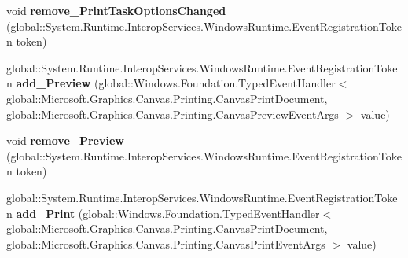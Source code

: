 \begin{DoxyCompactItemize}
\item 
\mbox{\label{interface_microsoft_1_1_graphics_1_1_canvas_1_1_printing_1_1_i_canvas_print_document_a1da96a2ebf4b67369628fa017a384b71}} 
void {\bfseries remove\+\_\+\+Print\+Task\+Options\+Changed} (global\+::\+System.\+Runtime.\+Interop\+Services.\+Windows\+Runtime.\+Event\+Registration\+Token token)
\item 
\mbox{\label{interface_microsoft_1_1_graphics_1_1_canvas_1_1_printing_1_1_i_canvas_print_document_abaff1fcd43de732d25ae88fef48a23a9}} 
global\+::\+System.\+Runtime.\+Interop\+Services.\+Windows\+Runtime.\+Event\+Registration\+Token {\bfseries add\+\_\+\+Preview} (global\+::\+Windows.\+Foundation.\+Typed\+Event\+Handler$<$ global\+::\+Microsoft.\+Graphics.\+Canvas.\+Printing.\+Canvas\+Print\+Document, global\+::\+Microsoft.\+Graphics.\+Canvas.\+Printing.\+Canvas\+Preview\+Event\+Args $>$ value)
\item 
\mbox{\label{interface_microsoft_1_1_graphics_1_1_canvas_1_1_printing_1_1_i_canvas_print_document_a86ed67a2bf892a9f75d0f01ef8fa6436}} 
void {\bfseries remove\+\_\+\+Preview} (global\+::\+System.\+Runtime.\+Interop\+Services.\+Windows\+Runtime.\+Event\+Registration\+Token token)
\item 
\mbox{\label{interface_microsoft_1_1_graphics_1_1_canvas_1_1_printing_1_1_i_canvas_print_document_a4a78f4b715e692c620d4548df21d5ac0}} 
global\+::\+System.\+Runtime.\+Interop\+Services.\+Windows\+Runtime.\+Event\+Registration\+Token {\bfseries add\+\_\+\+Print} (global\+::\+Windows.\+Foundation.\+Typed\+Event\+Handler$<$ global\+::\+Microsoft.\+Graphics.\+Canvas.\+Printing.\+Canvas\+Print\+Document, global\+::\+Microsoft.\+Graphics.\+Canvas.\+Printing.\+Canvas\+Print\+Event\+Args $>$ value)
\item 
\mbox{\label{interface_microsoft_1_1_graphics_1_1_canvas_1_1_printing_1_1_i_canvas_print_document_a6c6e9590103da951592e47820ae53fdb}} 

\end{DoxyCompactItemize}
